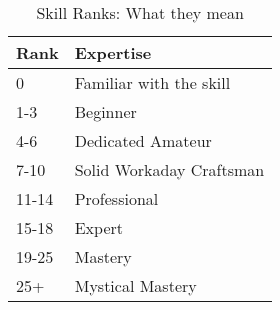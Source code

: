 \begin{table}
	\begin{tabular}{ll}
    Rank & Expertise \\
\hline
	0           & Familiar with the skill \\
	1-3         & Beginner \\
	4-6         & Dedicated Amateur \\
	7-10        & Solid Workaday Craftsman \\
	11-14       & Professional \\
	15-18       & Expert \\
	19-25       & Mastery \\
	25+         & Mystical Mastery \\
	\end{tabular}
    \caption{Skill Ranks: What they mean}\label{Table:SkillRanks}
\end{table}

